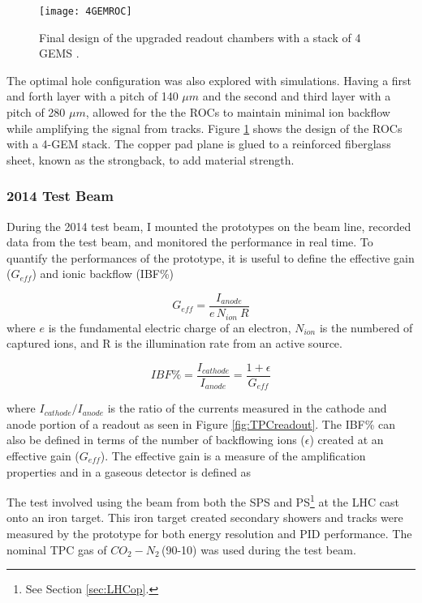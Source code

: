 \begin{figure}[h]
\texttt{[image: 4GEMROC]}
\centering
\caption{Final design of the upgraded readout chambers with a stack of 4 GEMS \cite{CERN-LHCC-2013-020}. }
\label{fig:4GEM}
\end{figure}

The optimal hole configuration was also explored with simulations.  Having a first and forth layer with a pitch of 140 $\mu m$ and the second and third layer with a pitch of 280 $\mu m$, allowed for the the ROCs to maintain minimal ion backflow while amplifying the signal from tracks.  Figure \ref{fig:4GEM} shows the design of the ROCs with a 4-GEM stack.  The copper pad plane is glued to a reinforced fiberglass sheet, known as the strongback, to add material strength.

\subsubsection{2014 Test Beam}

During the 2014 test beam, I mounted the prototypes on the beam line, recorded data from the test beam, and monitored the performance in real time.  To quantify the performances of the prototype, it is useful to define the effective gain ($G_{eff}$) and ionic backflow (IBF\%)

\begin{equation}
G_{eff}=\frac{I_{anode}}{\textit{e} \,  N_{ion} \ R}
\label{eq:gain}
\end{equation}
\noindent
where $\textit{e}$ is the fundamental electric charge of an electron, $N_{ion}$ is the numbered of captured ions, and R is the illumination rate from an active source.

\begin{equation}
IBF \% = \frac{ I_{cathode} }{ I_{anode} } = \frac{1 + \epsilon }{ G_{eff} }
\label{eq:IBF}
\end{equation}

\noindent
where $ I_{cathode} / I_{anode}$ is the ratio of the currents measured in the cathode and anode portion of a readout as seen in Figure \ref{fig:TPCreadout}.  The IBF\% can also be defined in terms of the number of backflowing ions ($\epsilon$) created at an effective gain ($G_{eff}$).  The effective gain is a measure of the amplification properties and in a gaseous detector is defined as

The test involved using the beam from both the SPS and PS\footnote{See Section \ref{sec:LHCop}.} at the LHC cast onto an iron target.  This iron target created secondary showers and tracks were measured by the prototype for both energy resolution and PID performance.  The nominal TPC gas of $CO_{2}-N_{2}\,$(90-10) was used during the test beam.  

